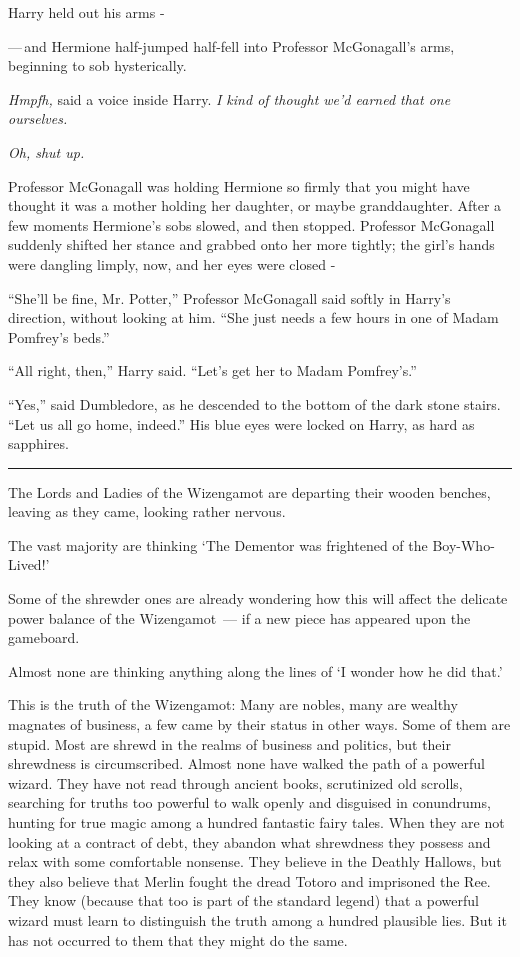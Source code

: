Harry held out his arms -

---\,and Hermione half-jumped half-fell into Professor McGonagall's arms, beginning to sob hysterically.

\emph{Hmpfh,} said a voice inside Harry. \emph{I kind of thought we'd earned that one ourselves.}

\emph{Oh, shut up.}

Professor McGonagall was holding Hermione so firmly that you might have thought it was a mother holding her daughter, or maybe granddaughter. After a few moments Hermione's sobs slowed, and then stopped. Professor McGonagall suddenly shifted her stance and grabbed onto her more tightly; the girl's hands were dangling limply, now, and her eyes were closed -

``She'll be fine, Mr. Potter,'' Professor McGonagall said softly in Harry's direction, without looking at him. ``She just needs a few hours in one of Madam Pomfrey's beds.''

``All right, then,'' Harry said. ``Let's get her to Madam Pomfrey's.''

``Yes,'' said Dumbledore, as he descended to the bottom of the dark stone stairs. ``Let us all go home, indeed.'' His blue eyes were locked on Harry, as hard as sapphires.

\begin{center}\rule{3in}{0.4pt}\end{center}

The Lords and Ladies of the Wizengamot are departing their wooden benches, leaving as they came, looking rather nervous.

The vast majority are thinking `The Dementor was frightened of the Boy-Who-Lived!'

Some of the shrewder ones are already wondering how this will affect the delicate power balance of the Wizengamot~--- if a new piece has appeared upon the gameboard.

Almost none are thinking anything along the lines of `I wonder how he did that.'

This is the truth of the Wizengamot: Many are nobles, many are wealthy magnates of business, a few came by their status in other ways. Some of them are stupid. Most are shrewd in the realms of business and politics, but their shrewdness is circumscribed. Almost none have walked the path of a powerful wizard. They have not read through ancient books, scrutinized old scrolls, searching for truths too powerful to walk openly and disguised in conundrums, hunting for true magic among a hundred fantastic fairy tales. When they are not looking at a contract of debt, they abandon what shrewdness they possess and relax with some comfortable nonsense. They believe in the Deathly Hallows, but they also believe that Merlin fought the dread Totoro and imprisoned the Ree. They know (because that too is part of the standard legend) that a powerful wizard must learn to distinguish the truth among a hundred plausible lies. But it has not occurred to them that they might do the same.

